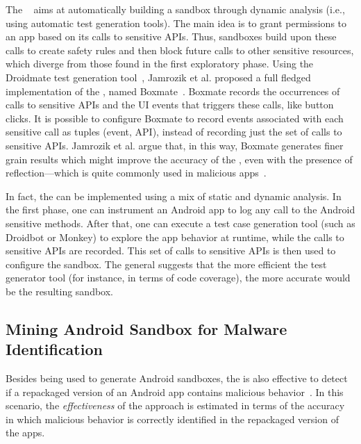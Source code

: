 The \mas~\cite{DBLP:conf/icse/JamrozikSZ16} aims at automatically
building a sandbox through dynamic analysis (i.e., using automatic test generation tools).
The main idea is to grant permissions to an app based on its calls to sensitive APIs.
Thus, sandboxes build upon these calls to create safety rules and then block future
calls to other sensitive resources, which diverge from those found in the first exploratory
phase. Using the Droidmate test generation tool~\cite{DBLP:conf/icse/JamrozikZ16},
Jamrozik et al. proposed a full fledged
implementation of the \mas, named Boxmate~\cite{DBLP:conf/icse/JamrozikSZ16}. 
Boxmate records the occurrences of calls to sensitive APIs and the UI events that triggers these calls,
like button clicks. It is possible to configure Boxmate to record events associated with each sensitive call as
tuples (event, API), instead of recording just the set of calls to sensitive APIs. Jamrozik et al. argue that, in this way, Boxmate generates finer
grain results which
might improve the accuracy of the \mas, even with the presence of reflection---which is quite commonly used in
malicious apps~\cite{DBLP:conf/issta/0029BOK16}.

In fact, the \mas can be implemented using
a mix of static and dynamic analysis. In the first phase, one
can instrument an Android app to log any call to the Android sensitive methods.
After that, one can execute a test case generation tool (such as Droidbot
or Monkey) to explore the app behavior at runtime,
while the calls to sensitive APIs are recorded.
This set of calls to sensitive APIs is then used
to configure the sandbox. The general \mas %
suggests that the more efficient the test generator tool (for instance, in terms of code coverage),
the more accurate would be the resulting sandbox.



\subsection{Mining Android Sandbox for Malware Identification}

Besides being used to generate Android sandboxes, the \mas is also effective 
to detect if a repackaged version of an Android app contains malicious
behavior~\cite{DBLP:conf/wcre/BaoLL18}. In this scenario, the \emph{effectiveness} of the approach
is estimated in terms of the accuracy in which malicious behavior is correctly identified in the repackaged version of the
apps.


